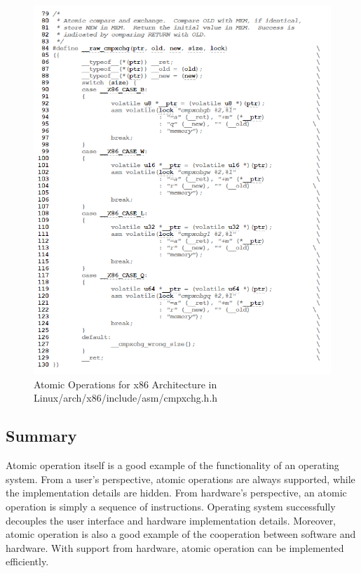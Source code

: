 \documentclass[10pt]{sigplanconf}
\begin{document}
\begin{figure}[h!]
  \centering
  \includegraphics[scale=0.5]{x86_atomic.png}
  \caption{Atomic Operations for x86 Architecture in Linux/arch/x86/include/asm/cmpxchg.h.h}
  \label{fig:ec}
\end{figure}

\subsection{Summary}
Atomic operation itself is a good example of the functionality of an operating system. From a user's perspective, atomic operations are always supported, while the implementation details are hidden. From hardware's perspective, an atomic operation is simply a sequence of instructions. Operating system successfully decouples the user interface and hardware implementation details. Moreover, atomic operation is also a good example of the cooperation between software and hardware. With support from hardware, atomic operation can be implemented efficiently. \\
\end{document}
